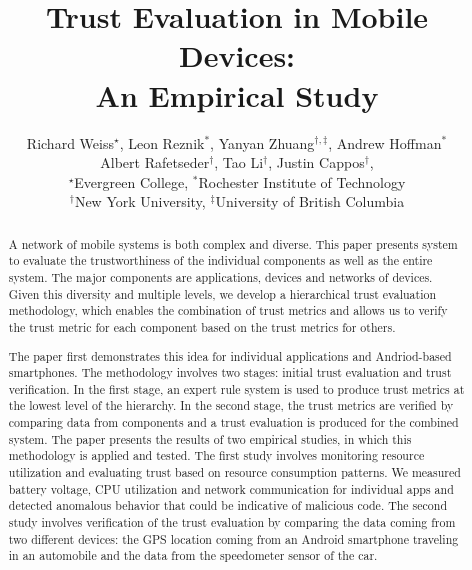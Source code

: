 \documentclass{IEEEtran}
\begin{document}
\title{Trust Evaluation in Mobile Devices: \\An Empirical Study}
\author{Richard Weiss$^{\star}$, Leon Reznik$^*$, Yanyan Zhuang$^{\dag, \ddag}$, Andrew Hoffman$^*$\\
Albert Rafetseder$^{\dag}$, Tao Li$^{\dag}$, Justin Cappos$^{\dag}$, \\
$^{\star}$Evergreen College, $^*$Rochester Institute of Technology\\
$^{\dag}$New York University, $^{\ddag}$University of British Columbia}

\maketitle

  
\begin{abstract}
A network of mobile systems is both complex and diverse.  This paper presents 
system to evaluate the trustworthiness of the individual components as well as the entire system. 
The major components are applications, devices and networks of devices.  
Given this diversity and multiple levels, we develop
a hierarchical trust evaluation methodology, which enables the combination of trust metrics 
and allows us to verify the trust metric for each component
based on the trust metrics for others.

The paper first demonstrates this idea for individual applications and Andriod-based smartphones.
The methodology involves two stages: initial trust evaluation and trust verification.
In the first stage, an expert rule system is used to produce trust metrics at the lowest level of
the hierarchy.  In the second stage, the trust metrics are verified
by comparing data from components and a trust evaluation is produced for the 
combined system.  The paper presents the results of two empirical studies, in which 
this methodology is applied and tested. The first study involves 
monitoring resource utilization and evaluating trust based on 
resource consumption patterns. We measured battery voltage, CPU utilization and network communication
for individual apps and detected anomalous behavior that could be indicative of malicious code.
The second study involves verification of the trust evaluation by 
comparing the data coming from two different devices: the 
GPS location coming from an Android smartphone traveling in an automobile and the data from the speedometer
sensor of the car.


\end{abstract}
\end{document}
